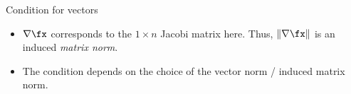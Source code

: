 \documentclass[11pt,compress,t,notes=noshow, xcolor=table]{beamer}
\begin{document}
\begin{vbframe}{Condition for vectors}
\begin{itemize}
\item $\nabla \fx$ corresponds to the $1 \times n$ Jacobi matrix here. Thus, $\|\nabla \fx\|$ is an induced \emph{matrix norm}.
\item The condition depends on the choice of the vector norm / induced matrix norm.
\end{itemize}


\end{vbframe}

%
%
%
%
%
%
\end{document}
